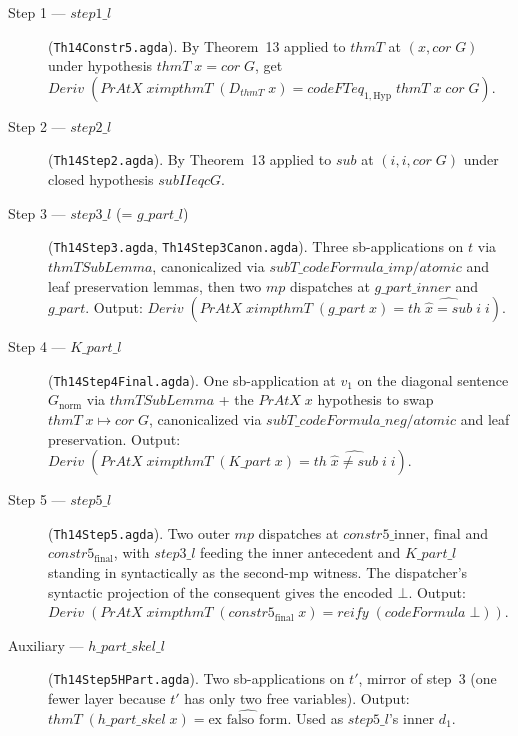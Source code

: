 \documentclass[11pt]{article}
\begin{document}
\begin{description}
  \item[Step 1 --- $\mathit{step1\_l}$] (\verb|Th14Constr5.agda|).  By Theorem~13 applied to $\mathit{thmT}$ at $(x, \mathit{cor}\;G)$ under hypothesis $\mathit{thmT}\;x = \mathit{cor}\;G$, get
  $\mathit{Deriv}\;(\mathit{PrAtX}\;x \mathrel{\mathit{imp}} \mathit{thmT}\;(D_{\mathit{thmT}}\;x) = \mathit{codeFTeq}_{1,\mathrm{Hyp}}\;\mathit{thmT}\;x\;\mathit{cor}\;G)$.

  \item[Step 2 --- $\mathit{step2\_l}$] (\verb|Th14Step2.agda|).  By Theorem~13 applied to $\mathit{sub}$ at $(i, i, \mathit{cor}\;G)$ under closed hypothesis $\mathit{subIIeqcG}$.

  \item[Step 3 --- $\mathit{step3\_l}$ (= $g\_\mathit{part}\_l$)] (\verb|Th14Step3.agda|, \verb|Th14Step3Canon.agda|).  Three sb-applications on $t$ via $\mathit{thmTSubLemma}$, canonicalized via $\mathit{subT}\_\mathit{codeFormula}\_\mathit{imp/atomic}$ and leaf preservation lemmas, then two $\mathit{mp}$ dispatches at $g\_\mathit{part}\_\mathit{inner}$ and $g\_\mathit{part}$.  Output: $\mathit{Deriv}\;(\mathit{PrAtX}\;x \mathrel{\mathit{imp}} \mathit{thmT}\;(g\_\mathit{part}\;x) = \widehat{\mathit{th}\;\hat x = \mathit{sub}\;i\;i})$.

  \item[Step 4 --- $K\_\mathit{part}\_l$] (\verb|Th14Step4Final.agda|).  One sb-application at $v_1$ on the diagonal sentence $G_{\mathrm{norm}}$ via $\mathit{thmTSubLemma}$ + the $\mathit{PrAtX}\;x$ hypothesis to swap $\mathit{thmT}\;x \mapsto \mathit{cor}\;G$, canonicalized via $\mathit{subT}\_\mathit{codeFormula}\_\mathit{neg/atomic}$ and leaf preservation.  Output: $\mathit{Deriv}\;(\mathit{PrAtX}\;x \mathrel{\mathit{imp}} \mathit{thmT}\;(K\_\mathit{part}\;x) = \widehat{\mathit{th}\;\hat x \neq \mathit{sub}\;i\;i})$.

  \item[Step 5 --- $\mathit{step5\_l}$] (\verb|Th14Step5.agda|).  Two outer $\mathit{mp}$ dispatches at $\mathit{constr5}\_{\mathrm{inner,\,final}}$ and $\mathit{constr5}_{\mathrm{final}}$, with $\mathit{step3\_l}$ feeding the inner antecedent and $K\_\mathit{part}\_l$ standing in syntactically as the second-mp witness.  The dispatcher's syntactic projection of the consequent gives the encoded $\bot$.  Output: $\mathit{Deriv}\;(\mathit{PrAtX}\;x \mathrel{\mathit{imp}} \mathit{thmT}\;(\mathit{constr5}_{\mathrm{final}}\;x) = \mathit{reify}\;(\mathit{codeFormula}\;\bot))$.

  \item[Auxiliary --- $h\_\mathit{part}\_\mathit{skel}\_l$] (\verb|Th14Step5HPart.agda|).  Two sb-applications on $t'$, mirror of step~3 (one fewer layer because $t'$ has only two free variables).  Output: $\mathit{thmT}\;(h\_\mathit{part}\_\mathit{skel}\;x) = \widehat{\text{ex falso form}}$.  Used as $\mathit{step5\_l}$'s inner $d_1$.
\end{description}
\end{document}
